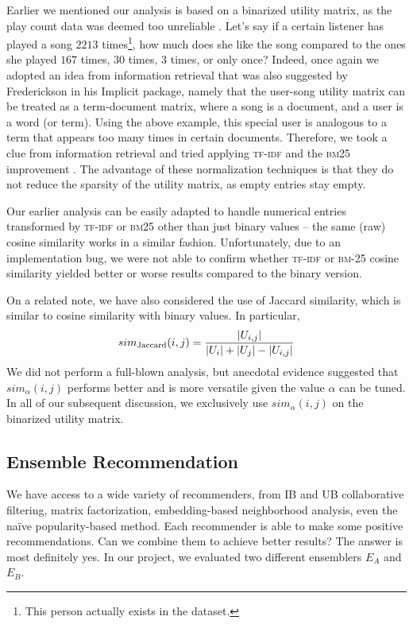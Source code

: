 \documentclass[conference]{IEEEtran}
\begin{document}
Earlier we mentioned our analysis is based on a binarized utility matrix,
as the play count data was deemed too unreliable 
\cite{aiolli2013efficient}. Let's say if a certain listener has
played a song $2213$
times\footnote{This person actually exists in the dataset.},
how much does she like the song
compared to the ones she played $167$ times, $30$ times,
$3$ times, or only once?
Indeed, once again we adopted an idea from information retrieval
that was also suggested by Frederickson in his Implicit package,
namely that the user-song utility matrix can be treated as a
term-document matrix, where a song is a document, and a user is a word
(or term).
Using the above example, this special user is analogous
to a term that appears too many times in certain documents.
Therefore, we took a clue from information retrieval and tried applying
\textsc{tf-idf} \cite{sparck1972statistical} and the
\textsc{bm25} improvement \cite{robertson1995okapi}.
The advantage of these normalization techniques is that they do not
reduce the sparsity of the utility matrix, as empty entries stay empty.

Our earlier analysis can be easily adapted to handle numerical entries
transformed by \textsc{tf-idf} or \textsc{bm25} other than just binary
values --
the same (raw) cosine similarity works in a
similar fashion. Unfortunately, due to an implementation bug, we were not
able to confirm whether \textsc{tf-idf} or \textsc{bm-25} cosine similarity
yielded better or worse results compared to the binary version.

On a related note, we have also considered the use of Jaccard similarity,
which is similar
to cosine similarity with binary values. In particular,
\begin{eqnarray*}
sim_{\rm Jaccard}(i,j) = \frac{|U_{i,j}|}{|U_i| + |U_j| - |U_{i,j}|}
\end{eqnarray*}
We did not perform a full-blown analysis, but
anecdotal evidence suggested that $sim_{\alpha}(i,j)$ performs better and
is more versatile
given the value $\alpha$ can be tuned.
In all of our subsequent discussion, we exclusively use $sim_{\alpha}(i,j)$
on the binarized utility matrix.

\subsection{Ensemble Recommendation}

We have access to a wide variety of recommenders, from IB and UB
collaborative filtering, matrix factorization, embedding-based neighborhood
analysis, even the
naïve
popularity-based method. Each recommender is able to
make some positive recommendations. Can we combine them to achieve better
results? The answer is most definitely yes.
In our project, we evaluated two different ensemblers $E_A$ and $E_B$.
\end{document}
